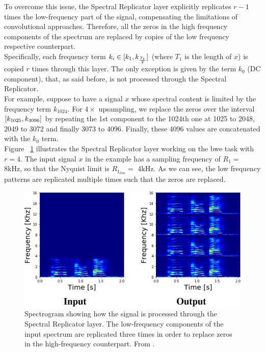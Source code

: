 To overcome this issue, the Spectral Replicator layer explicitly replicates $r - 1$ times the low-frequency part of the signal, compensating the limitations of convolutional approaches. Therefore, all the zeros in the high frequency components of the spectrum are replaced by copies of the low frequency respective counterpart.\\
Specifically, each frequency term $k_i \in \interval{k_1}{k_{\frac{T_1}{2}}}$ (where $T_1$ is the length of $x$) is copied $r$ times through this layer. The only exception is given by the term $k_0$ (DC component), that, as said before, is not processed through the Spectral Replicator. \\
For example, suppose to have a signal $x$ whose spectral content is limited by the frequency term $k_{1024}$. For $4\times$ upsampling, we replace the zeros over the interval $\interval{k_{1025}}{k_{4096}}$ by repeating the 1st component to the 1024th one at 1025 to 2048, 2049 to 3072 and finally 3073 to 4096. Finally, these 4096 values are concatenated with the $k_0$ term. \\
Figure ~\ref{fig:spectral_replicator} illustrates the Spectral Replicator layer working on the \gls{bwe} task with $r = 4$. The input signal $x$ in the example has a sampling frequency of $R_1 =$ 8kHz, so that the Nyquist limit is $R_{1_{lim}} =$ 4kHz. As we can see, the low frequency patterns are replicated multiple times such that the zeros are replaced. \\
\begin{figure}[!htb]
	\begin{center}
		\includegraphics[scale=0.65]{img/spectral_replicator.png}
		\captionsetup{margin=2cm}
		\caption{Spectrogram showing how the signal is processed through the Spectral Replicator layer. The low-frequency components of the input spectrum are replicated three times in order to replace zeros in the high-frequency counterpart. From \cite{lim2018time}.}
		\label{fig:spectral_replicator}
	\end{center}
\end{figure} 
